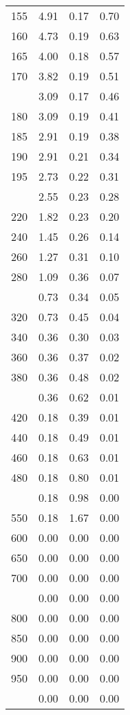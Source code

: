 \begin{table}[ht]
\begin{tabular}{lccc}
  155 & 4.91 & 0.17 & 0.70 \\ 
  160 & 4.73 & 0.19 & 0.63 \\ 
  165 & 4.00 & 0.18 & 0.57 \\ 
  170 & 3.82 & 0.19 & 0.51 \\ 
   \addlinespace
175 & 3.09 & 0.17 & 0.46 \\ 
  180 & 3.09 & 0.19 & 0.41 \\ 
  185 & 2.91 & 0.19 & 0.38 \\ 
  190 & 2.91 & 0.21 & 0.34 \\ 
  195 & 2.73 & 0.22 & 0.31 \\ 
   \addlinespace
200 & 2.55 & 0.23 & 0.28 \\ 
  220 & 1.82 & 0.23 & 0.20 \\ 
  240 & 1.45 & 0.26 & 0.14 \\ 
  260 & 1.27 & 0.31 & 0.10 \\ 
  280 & 1.09 & 0.36 & 0.07 \\ 
   \addlinespace
300 & 0.73 & 0.34 & 0.05 \\ 
  320 & 0.73 & 0.45 & 0.04 \\ 
  340 & 0.36 & 0.30 & 0.03 \\ 
  360 & 0.36 & 0.37 & 0.02 \\ 
  380 & 0.36 & 0.48 & 0.02 \\ 
   \addlinespace
400 & 0.36 & 0.62 & 0.01 \\ 
  420 & 0.18 & 0.39 & 0.01 \\ 
  440 & 0.18 & 0.49 & 0.01 \\ 
  460 & 0.18 & 0.63 & 0.01 \\ 
  480 & 0.18 & 0.80 & 0.01 \\ 
   \addlinespace
500 & 0.18 & 0.98 & 0.00 \\ 
  550 & 0.18 & 1.67 & 0.00 \\ 
  600 & 0.00 & 0.00 & 0.00 \\ 
  650 & 0.00 & 0.00 & 0.00 \\ 
  700 & 0.00 & 0.00 & 0.00 \\ 
   \addlinespace
750 & 0.00 & 0.00 & 0.00 \\ 
  800 & 0.00 & 0.00 & 0.00 \\ 
  850 & 0.00 & 0.00 & 0.00 \\ 
  900 & 0.00 & 0.00 & 0.00 \\ 
  950 & 0.00 & 0.00 & 0.00 \\ 
   \addlinespace
1000 & 0.00 & 0.00 & 0.00 \\ 
   \bottomrule
\end{tabular}
\end{table}

